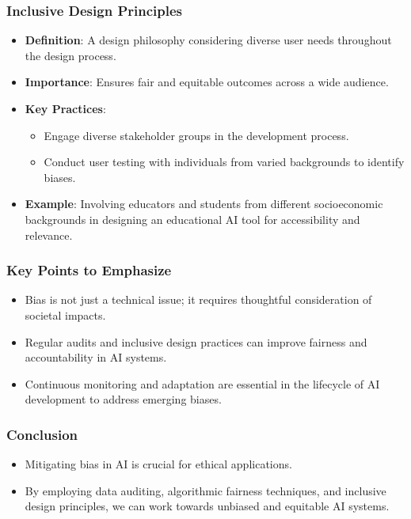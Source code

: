 \documentclass[aspectratio=169]{beamer}
\begin{document}
\begin{frame}[fragile]
    \frametitle{Inclusive Design Principles}
    \begin{itemize}
        \item \textbf{Definition}: A design philosophy considering diverse user needs throughout the design process.
        \item \textbf{Importance}: Ensures fair and equitable outcomes across a wide audience.
        \item \textbf{Key Practices}:
        \begin{itemize}
            \item Engage diverse stakeholder groups in the development process.
            \item Conduct user testing with individuals from varied backgrounds to identify biases.
        \end{itemize}
        \item \textbf{Example}: Involving educators and students from different socioeconomic backgrounds in designing an educational AI tool for accessibility and relevance.
    \end{itemize}
\end{frame}

\begin{frame}[fragile]
    \frametitle{Key Points to Emphasize}
    \begin{itemize}
        \item Bias is not just a technical issue; it requires thoughtful consideration of societal impacts.
        \item Regular audits and inclusive design practices can improve fairness and accountability in AI systems.
        \item Continuous monitoring and adaptation are essential in the lifecycle of AI development to address emerging biases.
    \end{itemize}
\end{frame}

\begin{frame}[fragile]
    \frametitle{Conclusion}
    \begin{itemize}
        \item Mitigating bias in AI is crucial for ethical applications.
        \item By employing data auditing, algorithmic fairness techniques, and inclusive design principles, we can work towards unbiased and equitable AI systems.
    \end{itemize}
\end{frame}
\end{document}
